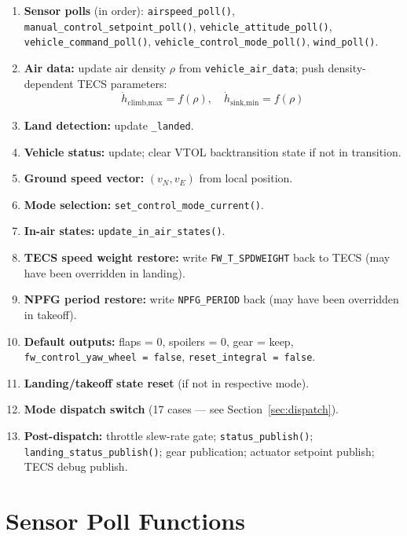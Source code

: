 \documentclass[12pt,a4paper]{article}
\begin{document}
\begin{enumerate}
  \item \textbf{Sensor polls} (in order):
        \texttt{airspeed\_poll()}, \texttt{manual\_control\_setpoint\_poll()},
        \texttt{vehicle\_attitude\_poll()}, \texttt{vehicle\_command\_poll()},
        \texttt{vehicle\_control\_mode\_poll()}, \texttt{wind\_poll()}.
  \item \textbf{Air data:} update air density $\rho$ from
        \texttt{vehicle\_air\_data}; push density-dependent TECS parameters:
        \begin{equation}
          \dot{h}_{\text{climb,max}} = f(\rho), \quad
          \dot{h}_{\text{sink,min}} = f(\rho)
        \end{equation}
  \item \textbf{Land detection:} update \texttt{\_landed}.
  \item \textbf{Vehicle status:} update; clear VTOL backtransition state if
        not in transition.
  \item \textbf{Ground speed vector:} $(v_N, v_E)$ from local position.
  \item \textbf{Mode selection:} \texttt{set\_control\_mode\_current()}.
  \item \textbf{In-air states:} \texttt{update\_in\_air\_states()}.
  \item \textbf{TECS speed weight restore:} write \texttt{FW\_T\_SPDWEIGHT}
        back to TECS (may have been overridden in landing).
  \item \textbf{NPFG period restore:} write \texttt{NPFG\_PERIOD} back
        (may have been overridden in takeoff).
  \item \textbf{Default outputs:} flaps = 0, spoilers = 0, gear = keep,
        \texttt{fw\_control\_yaw\_wheel = false},
        \texttt{reset\_integral = false}.
  \item \textbf{Landing/takeoff state reset} (if not in respective mode).
  \item \textbf{Mode dispatch switch} (17 cases --- see Section~\ref{sec:dispatch}).
  \item \textbf{Post-dispatch:} throttle slew-rate gate; \texttt{status\_publish()};
        \texttt{landing\_status\_publish()}; gear publication; actuator
        setpoint publish; TECS debug publish.
\end{enumerate}

\section{Sensor Poll Functions}
\end{document}
